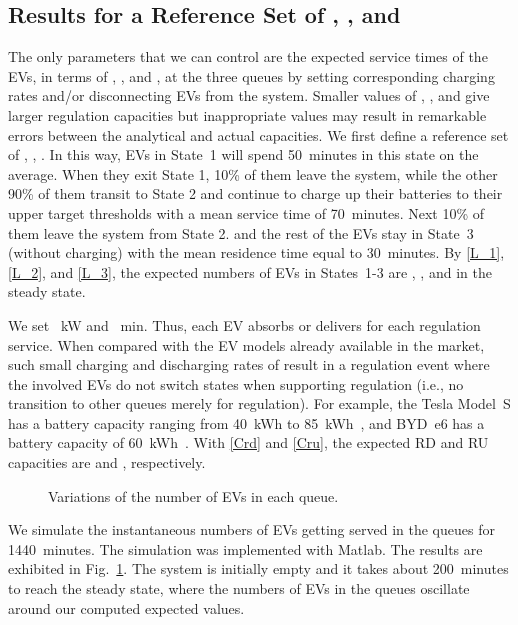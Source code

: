 \documentclass[journal]{IEEEtran}
\begin{document}
\subsection{Results for a Reference Set of , , and } \label{subsec:mu123}
The only parameters that we can control are the expected service times of the EVs, in terms of , , and , at the three queues by setting corresponding charging rates and/or disconnecting EVs from the system. Smaller values of , , and  give larger regulation capacities but inappropriate values may result in remarkable errors between the analytical and actual capacities. We first define a reference set of , , . In this way, EVs in State~1 will spend 50~minutes in this state
on the average. When they exit State 1, 10\% of them leave the system, while the
 other 90\% of them transit to State 2 and continue to  charge up their
batteries to their upper target thresholds  with a mean service
time of 70~minutes.  Next 10\% of them leave the system from State 2. 
and the rest of the EVs stay in State~3 (without
charging) with the mean residence time equal to 30~minutes. 
By \eqref{L_1}, \eqref{L_2}, and \eqref{L_3}, the expected numbers of EVs in
States~1-3 are , , and  in the steady
state.

We set ~kW and ~min.  Thus, each EV absorbs
or delivers  for each regulation service.  When compared with
the EV models already available in the market, such small charging and
discharging rates of  result in a regulation event where the involved
EVs do not switch states when supporting regulation (i.e., no transition to
other queues merely for regulation).  For example, the Tesla Model~S has a
battery capacity ranging from 40~kWh to 85~kWh~\cite{tesla}, and BYD~e6 has a
battery capacity of 60~kWh~\cite{byd}.  With \eqref{Crd} and \eqref{Cru}, the
expected RD and RU capacities are  and , respectively.

\begin{figure}[!t]
	\begin{center}
	\end{center}
	\caption{Variations of the number of EVs in each queue.}
  \label{fig:t_sim}
\end{figure}



We simulate the instantaneous numbers of EVs getting served in the queues for
1440~minutes.  The simulation was implemented with Matlab.  The results
are exhibited in Fig.~\ref{fig:t_sim}.  The system is initially empty and it
takes about 200~minutes to reach the steady state, where the numbers of EVs in
the queues oscillate around our computed expected values.
\end{document}
